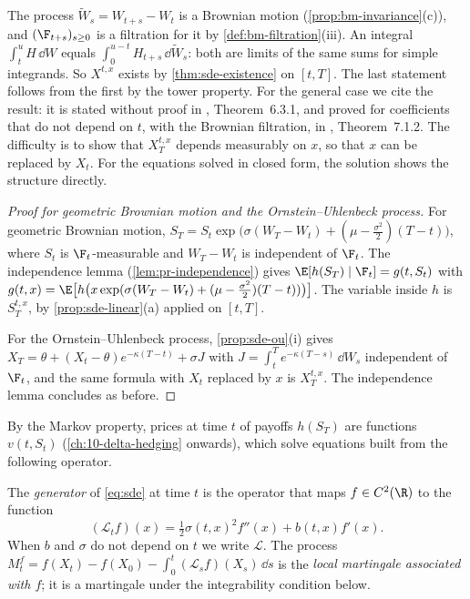 The process $\tilde W_s=W_{t+s}-W_t$ is a Brownian motion (\cref{prop:bm-invariance}(c)), and
$(\F_{t+s})_{s\ge0}$ is a filtration for it by \cref{def:bm-filtration}(iii). An integral
$\int_t^uH\,\dd W$ equals $\int_0^{u-t}H_{t+s}\,\dd\tilde W_s$: both are limits of the same
sums for simple integrands. So $X^{t,x}$ exists by \cref{thm:sde-existence} on $[t,T]$. The
last statement follows from the first by the tower property. For the general case we cite the
result: it is stated without proof in \textcite{shreve2}, Theorem~6.3.1, and proved for
coefficients that do not depend on $t$, with the Brownian filtration, in
\textcite{oksendal}, Theorem~7.1.2. The difficulty is to show that $X^{t,x}_T$ depends
measurably on $x$, so that $x$ can be replaced by $X_t$. For the equations solved in closed
form, the solution shows the structure directly.

\begin{proof}[Proof for geometric Brownian motion and the Ornstein--Uhlenbeck process]
For geometric Brownian motion,
$S_T=S_t\exp\big(\sigma(W_T-W_t)+(\mu-\frac{\sigma^2}2)(T-t)\big)$, where $S_t$ is
$\F_t$-measurable and $W_T-W_t$ is independent of $\F_t$. The independence lemma
(\cref{lem:pr-independence}) gives $\E[h(S_T)\mid\F_t]=g(t,S_t)$ with
$g(t,x)=\E\big[h\big(x\exp(\sigma(W_T-W_t)+(\mu-\frac{\sigma^2}2)(T-t))\big)\big]$. The
variable inside $h$ is $S^{t,x}_T$, by \cref{prop:sde-linear}(a) applied on $[t,T]$.

For the Ornstein--Uhlenbeck process, \cref{prop:sde-ou}(i) gives
$X_T=\theta+(X_t-\theta)e^{-\kappa(T-t)}+\sigma J$ with $J=\int_t^Te^{-\kappa(T-s)}\,\dd W_s$
independent of $\F_t$, and the same formula with $X_t$ replaced by $x$ is $X^{t,x}_T$. The
independence lemma concludes as before.
\end{proof}

By the Markov property, prices at time $t$ of payoffs $h(S_T)$ are functions $v(t,S_t)$
(\cref{ch:10-delta-hedging} onwards), which solve equations built from the following operator.

\begin{definition}[Generator]\label{def:sde-generator}
The \emph{generator} of \eqref{eq:sde} at time $t$ is the operator that maps
$f\in C^2(\R)$ to the function
\[
  (\mathcal L_tf)(x)=\tfrac12\sigma(t,x)^2f''(x)+b(t,x)f'(x).
\]
When $b$ and $\sigma$ do not depend on $t$ we write $\mathcal L$. The process
$M^f_t=f(X_t)-f(X_0)-\int_0^t(\mathcal L_sf)(X_s)\,\dd s$ is the \emph{local martingale
associated with $f$}; it is a martingale under the integrability condition below.
\end{definition}

